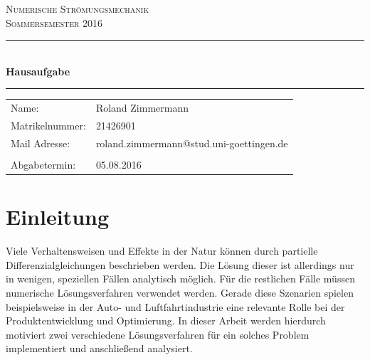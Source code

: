 \documentclass[12pt,a4paper,titlepage,headinclude,bibtotoc]{scrartcl}
\begin{document}
\begin{titlepage}
\centering
\textsc{\Large Numerische Strömungsmechanik\\
[1.5ex] Sommersemester 2016}

\vspace*{4.2cm}

\rule{\textwidth}{1pt}\\[0.5cm]
{\huge \bfseries
  Hausaufgabe\\[1.5ex]}
\rule{\textwidth}{1pt}

\vspace*{3.5cm}

\begin{Large}
\begin{tabular}{ll}
Name: & Roland Zimmermann\\
Matrikelnummer:	& 21426901 \\
Mail Adresse: & roland.zimmermann@stud.uni-goettingen.de \\ 
\\
Abgabetermin: & 05.08.2016\\
\end{tabular}
\end{Large}

\end{titlepage}



\tableofcontents

\newpage

\section{Einleitung}
\label{sec:einleitung}
Viele Verhaltensweisen und Effekte in der Natur können durch partielle Differenzialgleichungen beschrieben werden. Die Lösung dieser ist allerdings nur in wenigen, speziellen Fällen analytisch möglich. Für die restlichen Fälle müssen numerische Lösungsverfahren verwendet werden. Gerade diese Szenarien spielen beispielsweise in der Auto- und Luftfahrtindustrie eine relevante Rolle bei der Produktentwicklung und Optimierung. In dieser Arbeit werden hierdurch motiviert zwei verschiedene Lösungsverfahren für ein solches Problem implementiert und anschließend analysiert.
\end{document}
